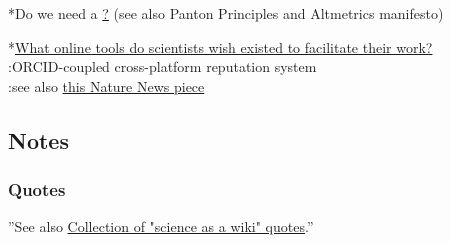 \documentclass[final,authoryear,3p]{elsarticle-open-drafting}
\begin{document}
*Do we need a \href{http://open-science.pen.io/ manifesto for open science}? (see also Panton Principles and Altmetrics manifesto)

*\href{http://www.quora.com/What-online-tools-do-scientists-wish-existed-to-facilitate-their-work/answer/Marius-Kempe}{What online tools do scientists wish existed to facilitate their work?}\\
:ORCID-coupled cross-platform reputation system\\
:see also \href{http://www.nature.com/news/2011/110511/full/473138a.html}{this Nature News piece}

\subsection{Notes}

\subsubsection{Quotes}
''See also \href{http://www.science3point0.com/coaspedia/index.php/User:Daniel_Mietchen/Talks/Slides/Quotes}{Collection of "science as a wiki" quotes}.''
\end{document}
